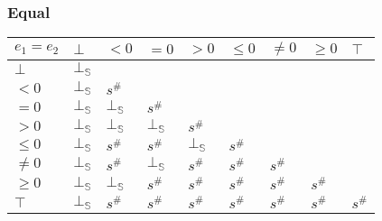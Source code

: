 \documentclass{beamer}
\begin{document}
        \begin{frame}
            \frametitle{Equal}
\begin{table}
    \begin{tabular}{|l|l|l|l|l|l|l|l|l|}
    \hline
    $e_1 = e_2$ & $\bot$ & $<0$   & $=0$   & $>0$   & $\le 0$ & $\ne 0$ & $\ge 0$ & $\top$ \\ \hline
    $\bot$      & $\bot_\mathbb{S}$ &        &        &        &         &         &         &        \\ \hline
    $<0$        & $\bot_\mathbb{S}$ & $s^\#$ &        &        &         &         &         &        \\ \hline
    $=0$        & $\bot_\mathbb{S}$ & $\bot_\mathbb{S}$ & $s^\#$ &        &         &         &         &        \\ \hline
    $>0$        & $\bot_\mathbb{S}$ & $\bot_\mathbb{S}$ & $\bot_\mathbb{S}$ & $s^\#$ &         &         &         &        \\ \hline
    $\le 0$     & $\bot_\mathbb{S}$ & $s^\#$ & $s^\#$ & $\bot_\mathbb{S}$ & $s^\#$  &         &         &        \\ \hline
    $\ne 0$     & $\bot_\mathbb{S}$ & $s^\#$ & $\bot_\mathbb{S}$ & $s^\#$ & $s^\#$  & $s^\#$  &         &        \\ \hline
    $\ge 0$     & $\bot_\mathbb{S}$ & $\bot_\mathbb{S}$ & $s^\#$ & $s^\#$ & $s^\#$  & $s^\#$  & $s^\#$  &        \\ \hline
    $\top$      & $\bot_\mathbb{S}$ & $s^\#$ & $s^\#$ & $s^\#$ & $s^\#$  & $s^\#$  & $s^\#$  & $s^\#$ \\ \hline
    \end{tabular}
    \end{table}
\end{frame}
\end{document}
